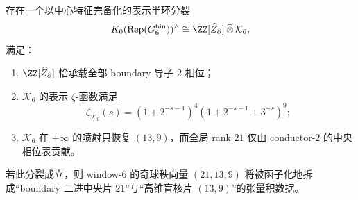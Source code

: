 \begin{conjecture}\label{conj:conclusion-window6-boundary-conductor-two-tensor-splitting}
存在一个以中心特征完备化的表示半环分裂
\[
K_0(\mathrm{Rep}(G_6^{\mathrm{bin}}))^{\wedge}
\cong
\ZZ[\widehat Z_{\partial}]\,\widehat\otimes\,\mathcal K_6,
\]
满足：
\begin{enumerate}
  \item \(\ZZ[\widehat Z_{\partial}]\) 恰承载全部 boundary 导子 \(2\) 相位；
  \item \(\mathcal K_6\) 的表示 \(\zeta\)-函数满足
  \[
  \zeta_{\mathcal K_6}(s)=(1+2^{-s-1})^4(1+2^{-s-1}+3^{-s})^9;
  \]
  \item \(\mathcal K_6\) 在 \(+\infty\) 的喷射只恢复 \((13,9)\)，而全局 rank \(21\) 仅由 conductor-\(2\) 的中央相位表贡献。
\end{enumerate}
若此分裂成立，则 window-\(6\) 的奇球秩向量 \((21,13,9)\) 将被函子化地拆成“boundary 二进中央片 \(21\)”与“高维盲核片 \((13,9)\)”的张量积数据。
\end{conjecture}
